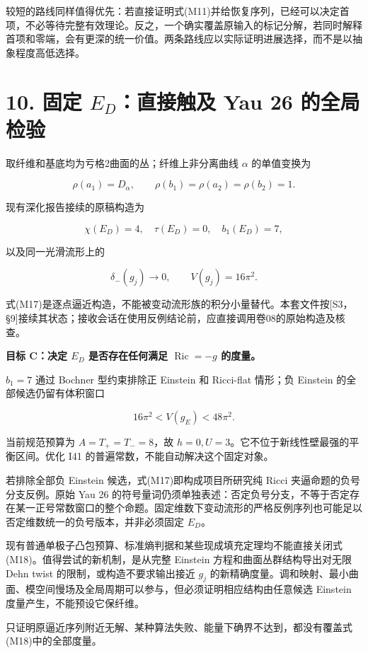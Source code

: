 \documentclass[UTF8,a4paper,11pt,fontset=fandol]{ctexart}
\begin{document}
较短的路线同样值得优先：若直接证明式(M11)并给恢复序列，已经可以决定首项，不必等待完整有效理论。反之，一个确实覆盖原输入的标记分解，若同时解释首项和零端，会有更深的统一价值。两条路线应以实际证明进展选择，而不是以抽象程度高低选择。

\section{\texorpdfstring{10. 固定 \(E_D\)：直接触及 Yau 26
的全局检验}{10. 固定 E\_D：直接触及 Yau 26 的全局检验}}\label{ux56faux5b9a-e_dux76f4ux63a5ux89e6ux53ca-yau-26-ux7684ux5168ux5c40ux68c0ux9a8c}

取纤维和基底均为亏格2曲面的丛；纤维上非分离曲线 \(\alpha\) 的单值变换为

\[
\rho(a_1)=D_\alpha,\qquad
\rho(b_1)=\rho(a_2)=\rho(b_2)=1.
\]

现有深化报告接续的原稿构造为

\[
\chi(E_D)=4,\quad\tau(E_D)=0,\quad b_1(E_D)=7,
\]

以及同一光滑流形上的

\[
\delta_-(g_j)\to0,\qquad V(g_j)=16\pi^2.
\tag{M17}
\]

式(M17)是逐点逼近构造，不能被变动流形族的积分小量替代。本套文件按{[}S3，§9{]}接续其状态；接收会话在使用反例结论前，应直接调用卷08的原始构造及核查。

\textbf{目标 C：决定 \(E_D\) 是否存在任何满足 \(\operatorname{Ric}=-g\)
的度量。}

\(b_1=7\) 通过 Bochner 型约束排除正 Einstein 和 Ricci-flat 情形；负
Einstein 的全部候选仍留有体积窗口

\[
16\pi^2<V(g_E)<48\pi^2.
\tag{M18}
\]

当前规范预算为 \(A=T_+=T_-=8\)，故
\(h=0,U=3\)。它不位于新线性壁最强的平衡区间。优化 I41
的普遍常数，不能自动解决这个固定对象。

若排除全部负 Einstein 候选，式(M17)即构成项目所研究纯 Ricci
夹逼命题的负号分支反例。原始 Yau 26
的符号量词仍须单独表述：否定负号分支，不等于否定存在某一正号常数窗口的整个命题。固定维数下变动流形的严格反例序列也可能足以否定维数统一的负号版本，并非必须固定
\(E_D\)。

现有普通单极子凸包预算、标准熵判据和某些现成填充定理均不能直接关闭式(M18)。值得尝试的新机制，是从完整
Einstein 方程和曲面丛群结构导出对无限 Dehn twist
的限制，或构造不要求输出接近 \(g_j\)
的新精确度量。调和映射、最小曲面、模空间慢场及全局周期可以参与，但必须证明相应结构由任意候选
Einstein 度量产生，不能预设它保纤维。

只证明原逼近序列附近无解、某种算法失败、能量下确界不达到，都没有覆盖式(M18)中的全部度量。
\end{document}
